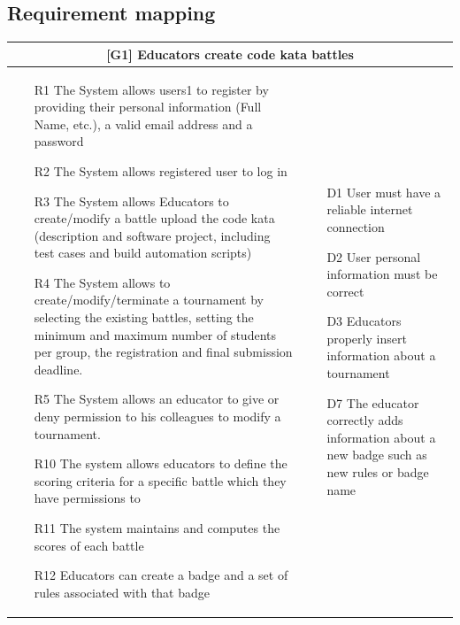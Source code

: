 \begin{enumerate}[label=\textbf{[UC\arabic*]}]
\subsection{Requirement mapping}
\begin{tabular}{|p{7cm}|p{7cm}|}
\hline
\multicolumn{2}{|c|}{
\textbf{[G1] Educators create code kata battles} }
\\
\hline
\begin{itemize} 
\item [R1] The System allows users1 to register by providing their personal information (Full Name, etc.), a valid email address and a password
\item [R2] The System allows registered user to log in
\item [R3] The System allows Educators to create/modify a battle upload the code kata (description and software project, including test cases and build automation scripts)
\item [R4] The System allows to create/modify/terminate a tournament by selecting the existing battles, setting the minimum and maximum number of students per group, the registration and final submission deadline.
\item [R5] The System allows an educator to give or deny permission to his colleagues to modify a tournament.
\item [R10] The system allows educators to define the scoring criteria for a specific battle which they have permissions to
\item [R11] The system maintains and computes the scores of each battle
\item [R12] Educators can create a badge and a set of rules associated with that badge
\end{itemize}
&
\begin{itemize}
    \item [D1] User must have a reliable internet connection
    \item [D2] User personal information must be correct
    \item [D3] Educators properly insert information about a tournament
    \item [D7] The educator correctly adds information about a new badge such as new rules or badge name
\end{itemize}
\\
\hline
\end{tabular}

\pagebreak


\end{enumerate}
